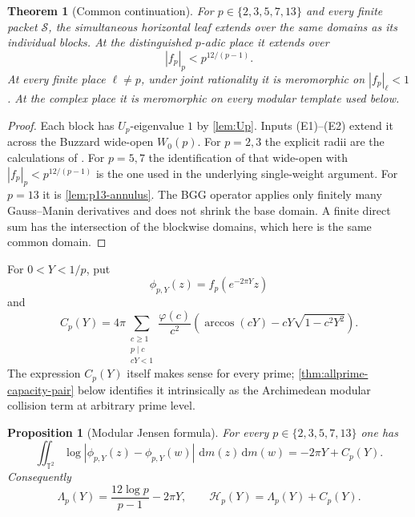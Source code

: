 \documentclass[11pt]{article}
\newtheorem{theorem}{Theorem}[section]
\newtheorem{proposition}[proposition]{Proposition}
\theoremstyle{definition}
\theoremstyle{remark}
\newcommand{\dd}{\,\mathrm d}
\newcommand{\Energy}{\mathscr H}
\newcommand{\abs}[1]{\left|#1\right|}
\newcommand{\T}{\mathbb T}
\begin{document}
\begin{theorem}[Common continuation]\label{thm:continuation}
For $p\in\{2,3,5,7,13\}$ and every finite packet $\mathcal S$, the
simultaneous horizontal leaf extends over the same domains as its individual
blocks.  At the distinguished $p$-adic place it extends over
\[
 \abs{f_p}_p<p^{12/(p-1)}.
\]
At every finite place $\ell\ne p$, under joint rationality it is meromorphic
on $\abs{f_p}_\ell<1$.  At the complex place it is meromorphic on every
modular template used below.
\end{theorem}

\begin{proof}
Each block has $U_p$-eigenvalue $1$ by \cref{lem:Up}.  Inputs (E1)--(E2)
extend it across the Buzzard wide-open $W_0(p)$.  For $p=2,3$ the explicit radii are the calculations of
\cite[Lemma~3.1 and the proof of Theorem~3.5]{Calegari2005}.  For
$p=5,7$ the identification of that wide-open with
$|f_p|_p<p^{12/(p-1)}$ is the one used in the underlying single-weight
argument.  For $p=13$ it is \cref{lem:p13-annulus}.  The BGG operator applies
only finitely many Gauss--Manin derivatives and does not shrink the base
domain.  A finite direct sum has the intersection of the blockwise domains,
which here is the same common domain.
\end{proof}

For $0<Y<1/p$, put
\[
 \phi_{p,Y}(z)=f_p(e^{-2\pi Y}z)
\]
and
\begin{equation}\label{eq:Cp}
 C_p(Y)=4\pi
 \sum_{\substack{c\ge1\\p\mid c\\cY<1}}
 \frac{\varphi(c)}{c^2}
 \left(\arccos(cY)-cY\sqrt{1-c^2Y^2}\right).
\end{equation}
The expression $C_p(Y)$ itself makes sense for every prime;
\cref{thm:allprime-capacity-pair} below identifies it intrinsically as the
Archimedean modular collision term at arbitrary prime level.

\begin{proposition}[Modular Jensen formula]\label{prop:Jensen}
For every $p\in\{2,3,5,7,13\}$ one has
\begin{equation}\label{eq:Jensen}
 \iint_{\T^2}\log\abs{\phi_{p,Y}(z)-\phi_{p,Y}(w)}\,\dd m(z)\dd m(w)
 =-2\pi Y+C_p(Y).
\end{equation}
Consequently
\begin{equation}\label{eq:analytic-data}
 \Lambda_p(Y)=\frac{12\log p}{p-1}-2\pi Y,
 \qquad
 \Energy_p(Y)=\Lambda_p(Y)+C_p(Y).
\end{equation}
\end{proposition}
\end{document}

